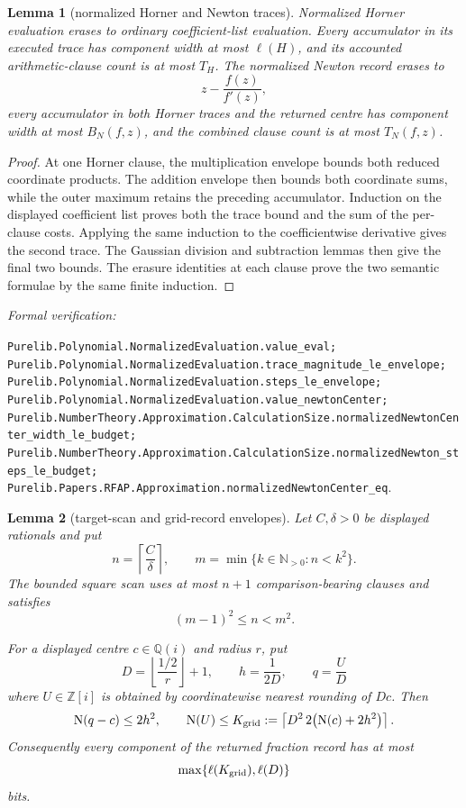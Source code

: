 \documentclass[11pt]{article}
\newtheorem{lemma}[lemma]{Lemma}
\newcommand{\Qi}{\mathbb{Q}(i)}
\newcommand{\Zi}{\mathbb{Z}[i]}
\newcommand{\N}{\mathbb{N}}
\newcommand{\Norm}[1]{\operatorname{N}\!\left(#1\right)}
\newcommand{\leanref}[1]{\par\smallskip\noindent
  \emph{Formal verification:}\par\nobreak
  {\raggedright\nolinkurl{#1}.\par}}
\begin{document}
\begin{lemma}[normalized Horner and Newton traces]
\label{lem:normalized-horner-envelope}
Normalized Horner evaluation erases to ordinary coefficient-list evaluation.
Every accumulator in its executed trace has component width at most
$\ell(H)$, and its accounted arithmetic-clause count is at most $T_H$.
The normalized Newton record erases to
\[
                z-\frac{f(z)}{f'(z)},
\]
every accumulator in both Horner traces and the returned centre has component
width at most $B_N(f,z)$, and the combined clause count is at most
$T_N(f,z)$.
\end{lemma}

\begin{proof}
At one Horner clause, the multiplication envelope bounds both reduced
coordinate products.  The addition envelope then bounds both coordinate
sums, while the outer maximum retains the preceding accumulator.  Induction
on the displayed coefficient list proves both the trace bound and the sum of
the per-clause costs.  Applying the same induction to the coefficientwise
derivative gives the second trace.  The Gaussian division and subtraction
lemmas then give the final two bounds.  The erasure identities at each clause
prove the two semantic formulae by the same finite induction.
\end{proof}

\leanref{Purelib.Polynomial.NormalizedEvaluation.value_eval;
Purelib.Polynomial.NormalizedEvaluation.trace_magnitude_le_envelope;
Purelib.Polynomial.NormalizedEvaluation.steps_le_envelope;
Purelib.Polynomial.NormalizedEvaluation.value_newtonCenter;
Purelib.NumberTheory.Approximation.CalculationSize.normalizedNewtonCenter_width_le_budget;
Purelib.NumberTheory.Approximation.CalculationSize.normalizedNewton_steps_le_budget;
Purelib.Papers.RFAP.Approximation.normalizedNewtonCenter_eq}

\begin{lemma}[target-scan and grid-record envelopes]
\label{lem:target-grid-envelope}
Let $C,\delta>0$ be displayed rationals and put
\[
 n=\left\lceil\frac C\delta\right\rceil,
 \qquad m=\min\{k\in\N_{>0}:n<k^2\}.
\]
The bounded square scan uses at most $n+1$ comparison-bearing clauses and
satisfies
\[
                         (m-1)^2\le n<m^2.
\]

For a displayed centre $c\in\Qi$ and radius $r$, put
\[
 D=\left\lfloor\frac{1/2}{r}\right\rfloor+1,
 \qquad h=\frac1{2D},
 \qquad q=\frac UD
\]
where $U\in\Zi$ is obtained by coordinatewise nearest rounding of $Dc$.
Then
\[
 \Norm{q-c}\le2h^2,
 \qquad
 \Norm U\le
 K_{\rm grid}:=\left\lceil
       D^2\,2\bigl(\Norm c+2h^2\bigr)\right\rceil.
\]
Consequently every component of the returned fraction record has at most
\[
                   \max\{\ell(K_{\rm grid}),\ell(D)\}
\]
bits.
\end{lemma}
\end{document}
